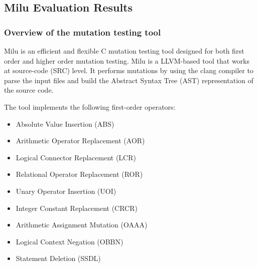 
\subsection{Milu Evaluation Results}
\label{subsec:milu}

\subsubsection{Overview of the mutation testing tool}

Milu is an efficient and flexible C mutation testing tool designed for both first order and higher order mutation testing. Milu is a LLVM-based tool that works at source-code (SRC) level. It performs mutations by using the clang compiler to parse the input files and build the Abstract Syntax Tree (AST) representation of the source code.

The tool implements the following first-order operators:
\begin{itemize}
	\item Absolute Value Insertion (ABS)
	\item Arithmetic Operator Replacement (AOR)
	\item Logical Connector Replacement (LCR)
	\item Relational Operator Replacement (ROR)
	\item Unary Operator Insertion (UOI)
	\item Integer Constant Replacement (CRCR)
	\item Arithmetic Assignment Mutation (OAAA)
	\item Logical Context Negation (OBBN)
	\item Statement Deletion (SSDL)
\end{itemize}

